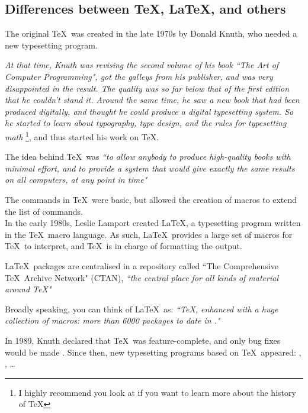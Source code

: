 \subsection{Differences between \TeX, \LaTeX, and others}

The original \TeX\ was created in the late 1970s by Donald Knuth, who needed a new typesetting program. 

\emph{At that time, Knuth was revising the second volume of his book \emph{``The Art of Computer Programming"},  got the galleys from his publisher, and was very disappointed in the result. The quality was so far below that of the first edition that he couldn't stand it. Around the same time, he saw a new book that had been produced digitally, and thought he could produce a digital typesetting system. So he started to learn about typography, type design, and the rules for typesetting math} \citep{tug}\footnote{I highly recommend you look at \cite{tug} if you want to learn more about the history of \TeX}, and thus started his work on \TeX.

\begin{note}
The idea behind \TeX\ was \emph{``to allow anybody to produce high-quality books with minimal effort, and to provide a system that would give exactly the same results on all computers, at any point in time"} \citep{wiki-tex}
\end{note}



The commands in \TeX\ were basic, but allowed the creation of macros to extend the list of commands. \\

In the early 1980s, Leslie Lamport created \LaTeX, a typesetting program written in the \TeX\ macro language. \citep{wiki-latex} 
As such, \LaTeX\ provides a large set of macros for \TeX\ to interpret, and \TeX\ is in charge of formatting the output.


\LaTeX\ packages are centralised in a repository called ``The Comprehensive \TeX\ Archive Network" (CTAN), \emph{``the central place for all kinds of material around \TeX"} %
%
\begin{note}
	
Broadly speaking, you can think of \LaTeX\ as: \emph{``\TeX, enhanced with a huge collection of macros: more than 6000 packages to date in \cite{CTAN}."}
\end{note}


In 1989, Knuth declared that \TeX\ was feature-complete, and only bug fixes would be made \citep{tex-vs-latex}. Since then, new typesetting programs based on \TeX\ appeared: \pdfTeX, \XeTeX, \LuaTeX\dots\\

